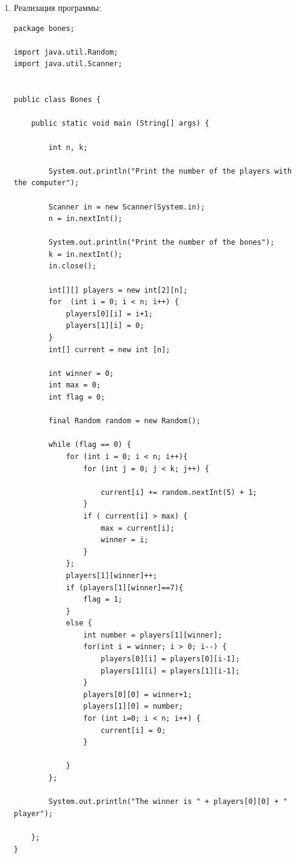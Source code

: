 \documentclass[a4paper]{article}
\begin{document}
    \begin{enumerate}

        \item Реализация программы:
        \begin{lstlisting}
package bones;

import java.util.Random;
import java.util.Scanner;


public class Bones {

    public static void main (String[] args) {

        int n, k;

        System.out.println("Print the number of the players with the computer");

        Scanner in = new Scanner(System.in);
        n = in.nextInt();

        System.out.println("Print the number of the bones");
        k = in.nextInt();
        in.close();
    
        int[][] players = new int[2][n];
        for  (int i = 0; i < n; i++) {
            players[0][i] = i+1;
            players[1][i] = 0;
        }
        int[] current = new int [n];

        int winner = 0;
        int max = 0;
        int flag = 0;

        final Random random = new Random();

        while (flag == 0) {
            for (int i = 0; i < n; i++){
                for (int j = 0; j < k; j++) {
                    
                    current[i] += random.nextInt(5) + 1; 
                }
                if ( current[i] > max) {
                    max = current[i];
                    winner = i;
                }
            };
            players[1][winner]++;
            if (players[1][winner]==7){
                flag = 1;
            } 
            else {
                int number = players[1][winner];
                for(int i = winner; i > 0; i--) {
                    players[0][i] = players[0][i-1];
                    players[1][i] = players[1][i-1];
                }
                players[0][0] = winner+1;
                players[1][0] = number;
                for (int i=0; i < n; i++) {
                    current[i] = 0;
                }

            }
        };

        System.out.println("The winner is " + players[0][0] + " player");

    };
}
        \end{lstlisting}
    

\end{enumerate}
\end{document}
